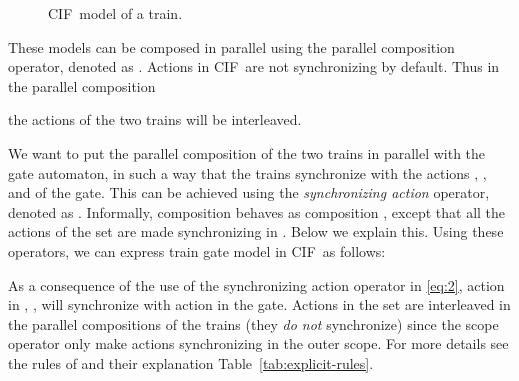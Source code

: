 \documentclass[submission,copyright,creativecommons,sharealike]{eptcs}
\newcommand{\CIF}{{CIF}}
\begin{document}
\begin{figure}[htb]
  \centering
  \caption{\CIF\ model of a train.}
  \label{fig:train}
\end{figure}

These models can be composed in parallel using the parallel
composition operator, denoted as . Actions in \CIF\ are not
synchronizing by default. Thus in the parallel composition

the actions of the two trains will be interleaved.

We want to put the parallel composition of the two trains in parallel
with the gate automaton, in such a way that the trains synchronize
with the actions , , and  of
the gate. This can be achieved using the \emph{synchronizing action}
operator, denoted as . Informally, composition
 behaves as composition , except that all the actions
of the set  are made synchronizing in . Below we explain this.
Using these operators, we can express train gate model in \CIF\ as follows:

As a consequence of the use of the synchronizing action operator in
\eqref{eq:2}, action  in , , will
synchronize with action  in the gate. Actions in the set
 are interleaved in the
parallel compositions of the trains (they \emph{do not} synchronize)
since the scope operator only make actions synchronizing in the outer
scope. For more details see the rules of and their explanation
Table~\ref{tab:explicit-rules}.
\end{document}
